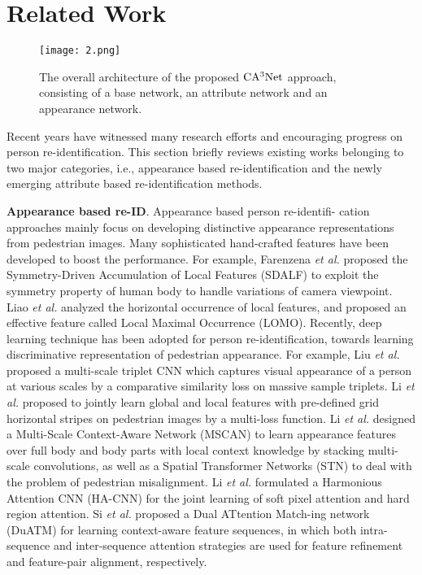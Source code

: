 \documentclass[sigconf]{acmart}
\begin{document}
\section{Related Work}\begin{figure*}[!t]
	\centering
	\texttt{[image: 2.png]}
	\caption{The overall architecture of the proposed $\rm CA^3Net$ approach, consisting of a base network, an attribute network and an appearance network.}
	\label{fig_overallss}
\end{figure*}

Recent years have witnessed many research efforts and encouraging progress on person re-identification.
This section briefly reviews existing works belonging to two major categories, i.e., appearance based re-identification and the newly emerging attribute based re-identification methods.

\textbf{Appearance based re-ID}. Appearance based person re-identifi-
cation approaches mainly focus on developing distinctive appearance representations from pedestrian images. Many sophisticated hand-crafted features have been developed to boost the performance. For example, Farenzena \textit{et al.}\cite{1} proposed the Symmetry-Driven Accumulation of Local Features (SDALF) to exploit the symmetry property of human body to handle variations of camera viewpoint. Liao \textit{et al.}\cite{2} analyzed the horizontal occurrence of local features, and proposed an effective feature called Local Maximal Occurrence (LOMO). Recently, deep learning technique has been adopted for person re-identification, towards learning discriminative representation of pedestrian appearance. For example, Liu \textit{et al.}\cite{40} proposed a multi-scale triplet CNN which captures visual appearance of a person at various scales by a comparative similarity loss on massive sample triplets. Li \textit{et al.}\cite{5} proposed to jointly learn global and local features with pre-defined grid horizontal stripes on pedestrian images by a multi-loss function. Li \textit{et al.}\cite{6} designed a Multi-Scale Context-Aware Network (MSCAN) to learn appearance features over full body and body parts with local context knowledge by stacking multi-scale convolutions, as well as a Spatial Transformer Networks (STN) to deal with the problem of pedestrian misalignment. Li \textit{et al.}\cite{7} formulated a Harmonious Attention CNN (HA-CNN) for the joint learning of soft pixel attention and hard region attention. Si \textit{et al.}\cite{8} proposed a Dual ATtention Match-ing network (DuATM) for learning context-aware feature sequences, in which both intra-sequence and inter-sequence attention strategies are used for feature refinement and feature-pair alignment, respectively.
\end{document}
